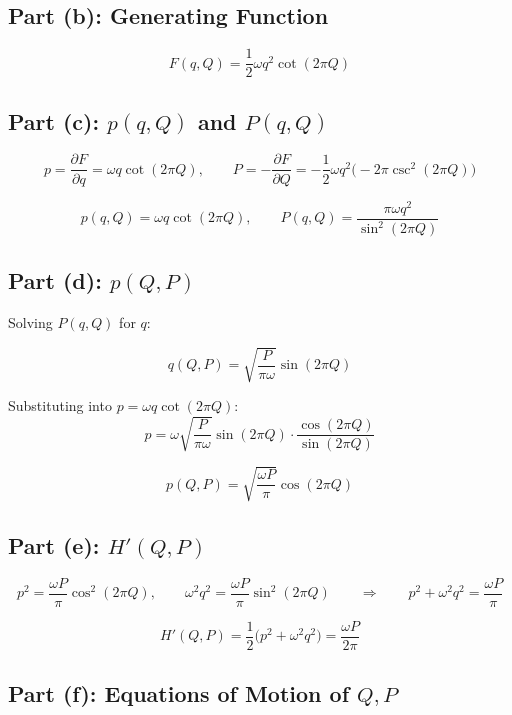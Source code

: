 \documentclass[11pt]{article}
\begin{document}
\subsection*{Part (b): Generating Function}

\[
    F(q,Q) = \frac12\omega q^2\cot(2\pi Q)
\]

\subsection*{Part (c): $p(q,Q)$ and $P(q,Q)$}

\[
    p = \frac{\partial F}{\partial q} = \omega q\cot(2\pi Q),
    \qquad
    P = -\frac{\partial F}{\partial Q} = -\frac12\omega q^2\big(-2\pi\csc^2(2\pi Q)\big)
\]
\begin{result}
\[
    p(q,Q) = \omega q\cot(2\pi Q), \qquad P(q,Q) = \frac{\pi\omega q^2}{\sin^2(2\pi Q)}
\]
\end{result}

\subsection*{Part (d): $p(Q,P)$}

Solving $P(q,Q)$ for $q$:
\begin{result}
\[
    q(Q,P) = \sqrt{\frac{P}{\pi\omega}}\sin(2\pi Q)
\]
\end{result}
Substituting into $p=\omega q\cot(2\pi Q)$:
\[
    p = \omega\sqrt{\frac{P}{\pi\omega}}\sin(2\pi Q)\cdot\frac{\cos(2\pi Q)}{\sin(2\pi Q)}
\]
\begin{result}
\[
    p(Q,P) = \sqrt{\frac{\omega P}{\pi}}\cos(2\pi Q)
\]
\end{result}

\subsection*{Part (e): $H'(Q,P)$}

\[
    p^2 = \frac{\omega P}{\pi}\cos^2(2\pi Q), \qquad \omega^2q^2 = \frac{\omega P}{\pi}\sin^2(2\pi Q)
    \qquad\Longrightarrow\qquad
    p^2+\omega^2q^2 = \frac{\omega P}{\pi}
\]
\begin{result}
\[
    H'(Q,P) = \frac12\big(p^2+\omega^2q^2\big) = \frac{\omega P}{2\pi}
\]
\end{result}

\subsection*{Part (f): Equations of Motion of $Q,P$}
\end{document}
